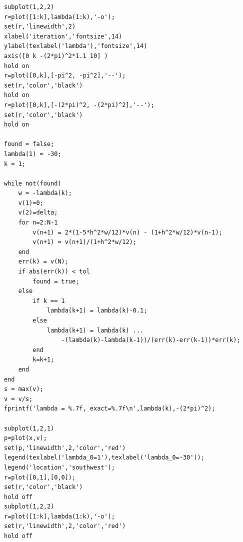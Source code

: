\begin{verbatim}
subplot(1,2,2)
r=plot([1:k],lambda(1:k),'-o');
set(r,'linewidth',2)
xlabel('iteration','fontsize',14)
ylabel(texlabel('lambda'),'fontsize',14)
axis([0 k -(2*pi)^2*1.1 10] )
hold on
r=plot([0,k],[-pi^2, -pi^2],'--');
set(r,'color','black')
hold on
r=plot([0,k],[-(2*pi)^2, -(2*pi)^2],'--');
set(r,'color','black')
hold on

found = false;
lambda(1) = -30;
k = 1;

while not(found)
    w = -lambda(k);
    v(1)=0;
    v(2)=delta;
    for n=2:N-1
        v(n+1) = 2*(1-5*h^2*w/12)*v(n) - (1+h^2*w/12)*v(n-1);
        v(n+1) = v(n+1)/(1+h^2*w/12);
    end
    err(k) = v(N);
    if abs(err(k)) < tol
        found = true;
    else
        if k == 1
            lambda(k+1) = lambda(k)-0.1;
        else
            lambda(k+1) = lambda(k) ...
                -(lambda(k)-lambda(k-1))/(err(k)-err(k-1))*err(k);
        end
        k=k+1;
    end
end
s = max(v);
v = v/s;
fprintf('lambda = %.7f, exact=%.7f\n',lambda(k),-(2*pi)^2);

subplot(1,2,1)
p=plot(x,v);
set(p,'linewidth',2,'color','red')
legend(texlabel('lambda_0=1'),texlabel('lambda_0=-30'));
legend('location','southwest');
r=plot([0,1],[0,0]);
set(r,'color','black')
hold off
subplot(1,2,2)
r=plot([1:k],lambda(1:k),'-o');
set(r,'linewidth',2,'color','red')
hold off
\end{verbatim}
\normalsize


\bigskip
\noindent
\program
\label{prog:qmho_eigenvalue}

